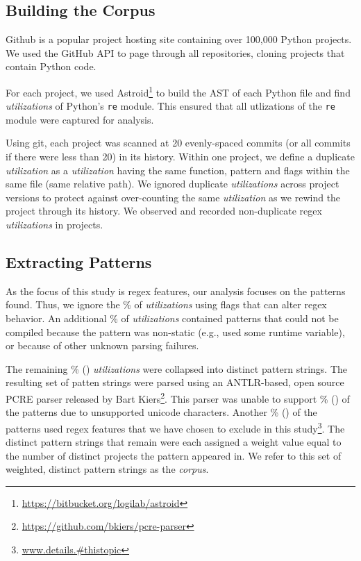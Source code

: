 \subsection{Building the Corpus}
\label{study:corpus}
Github is a popular project hosting site containing over 100,000 Python projects.
We used the GitHub API to page through all repositories, cloning projects that contain Python code. 

For each project, we used Astroid\footnote{\url{https://bitbucket.org/logilab/astroid}} to build the AST of each Python file and find \emph{utilizations} of Python's {\tt re} module. This ensured that all utlizations of the {\tt re} module were captured for analysis. 

Using git, each project was scanned at 20 evenly-spaced commits (or all commits if there were less than 20) in its history.
Within one project, we define a duplicate \emph{utilization} as a \emph{utilization} having the same function, pattern and flags within the same file (same relative path).  We ignored duplicate \emph{utilizations} across project versions to protect against over-counting the same \emph{utilization} as we rewind the project through its history.  We observed and recorded  non-duplicate regex \emph{utilizations} in  projects.

\subsection{Extracting Patterns}
As the focus of this study is regex features, our analysis focuses on the patterns found. Thus,  we ignore the \%  of \emph{utilizations} using flags that can alter regex behavior.  An additional \% of \emph{utilizations} contained patterns that could not be compiled because the pattern was non-static (e.g., used some runtime variable), or because of other unknown parsing failures.

The remaining \% () \emph{utilizations} were collapsed into  distinct pattern strings.  The resulting set of patten strings were parsed using an ANTLR-based, open source PCRE parser released by Bart Kiers\footnote{\url{https://github.com/bkiers/pcre-parser}}.  This parser was unable to support \% () of the patterns due to unsupported unicode characters.  Another \% () of the patterns used regex features that we have chosen to exclude in this study\footnote{\url{www.details.#thistopic}}.
  The  distinct pattern strings that remain were each assigned a weight value equal to the number of distinct projects the pattern appeared in.  We  refer to this set of weighted, distinct pattern strings as the \emph{corpus}.

